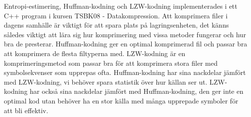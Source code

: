 
\noindent Entropi-estimering, Huffman-kodning och LZW-kodning implementerades i ett C++ program i kursen TSBK08 - Datakompression. Att komprimera filer i dagens samhälle är viktigt för att spara plats på lagringsenheten, det känns således viktigt att lära sig hur komprimering med vissa metoder fungerar och hur bra de presterar. Huffman-kodning ger en optimal komprimerad fil och passar bra att komprimera de flesta filtyperna med. LZW-kodning är en komprimeringsmetod som passar bra för att komprimera stora filer med symbolsekvenser som upprepas ofta. Huffman-kodning har sina nackdelar jämfört med LZW-kodning, vi behöver spara statistik över hur källan ser ut. LZW-kodning har också sina nackdelar jämfört med Huffman-kodning, den ger inte en optimal kod utan behöver ha en stor källa med många upprepade symboler för att bli effektiv.



